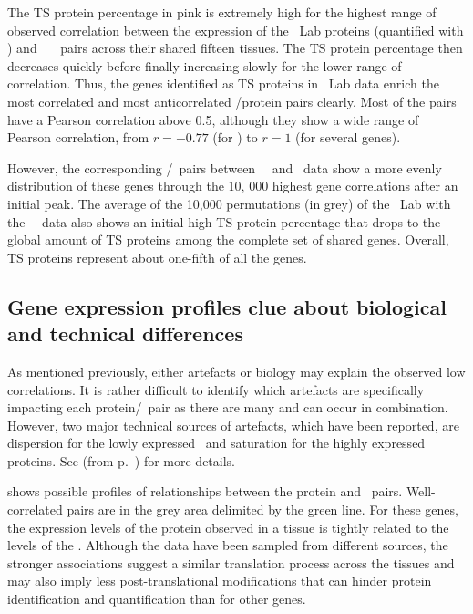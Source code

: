 The \gls{TS} protein percentage in pink is extremely high
for the highest range of observed correlation between the expression of
the \pandey\ Lab proteins (quantified with \PPKM) and
\uhlen\ \etal\ \mRNAs\ pairs
across their shared fifteen tissues.
The \gls{TS} protein percentage then decreases quickly
before finally increasing slowly for the lower range of correlation.
Thus, the genes identified as \gls{TS} proteins in \pandey\ Lab data enrich
the most correlated and most anticorrelated \mRNA/protein pairs clearly.
Most of the pairs have a Pearson correlation above 0.5,
although they show a wide range of Pearson correlation,
from $r= -0.77$ (for ) to $r=1$ (for several genes).\mybr\

However,
the corresponding \mRNA/\mRNA\ pairs between \uhlen\ \etal\ and \gtex\ data
show a more evenly distribution of these genes
through the 10, 000 highest gene correlations after an initial peak.
The average of the 10,000 permutations (in grey) of the \pandey\ Lab
with the \uhlen\ \etal\ data also shows
an initial high \gls{TS} protein percentage that drops
to the global amount of \gls{TS} proteins among the complete set of shared genes.
Overall, \gls{TS} proteins represent about one-fifth of all the genes.\mybr\

\subsection{Gene expression profiles clue about biological and technical differences\quad}
\vspace{-6mm}
As mentioned previously,
either artefacts or biology may explain the observed low correlations.
It is rather difficult to identify
which artefacts are specifically impacting each protein/\mRNA\ pair
as there are many and can occur in combination.
However, two major technical sources of artefacts,
which have been reported,
are dispersion for the lowly expressed \mRNAs\ and
saturation for the highly expressed proteins.
See  (from p.~\pageref{sec:transExplo})
for more details.\mybr\

 shows possible profiles of relationships
between the protein and \mRNA\ pairs.
Well-correlated pairs are in the grey area delimited by the green line.
For these genes, the expression levels of the protein observed in a tissue is
tightly related to the levels of the \mRNA{}.
Although the data have been sampled from different sources,
the stronger associations suggest a similar translation process across the tissues
and may also imply less post-translational modifications
that can hinder protein identification and quantification than for other genes.\mybr\

